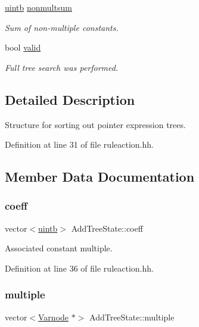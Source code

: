 \begin{DoxyCompactItemize}
\mbox{\hyperlink{types_8h_a2db313c5d32a12b01d26ac9b3bca178f}{uintb}} \mbox{\hyperlink{class_add_tree_state_a0673da5a1c73b83c06a96730b3676778}{nonmultsum}}
\begin{DoxyCompactList}\small\item\em Sum of non-\/multiple constants. \end{DoxyCompactList}\item 
bool \mbox{\hyperlink{class_add_tree_state_aac866a2b0c8bd9cb9e30840195a70293}{valid}}
\begin{DoxyCompactList}\small\item\em Full tree search was performed. \end{DoxyCompactList}\end{DoxyCompactItemize}


\subsection{Detailed Description}
Structure for sorting out pointer expression trees. 

Definition at line 31 of file ruleaction.\+hh.



\subsection{Member Data Documentation}
\mbox{\label{class_add_tree_state_aeb468ac572e503ef8ec084e9f0c1b766}} 
\subsubsection{\texorpdfstring{coeff}{coeff}}
{\footnotesize\ttfamily vector$<$\mbox{\hyperlink{types_8h_a2db313c5d32a12b01d26ac9b3bca178f}{uintb}}$>$ Add\+Tree\+State\+::coeff}



Associated constant multiple. 



Definition at line 36 of file ruleaction.\+hh.

\mbox{\label{class_add_tree_state_a33cf1a3308a896062f44f575c79bb161}} 
\subsubsection{\texorpdfstring{multiple}{multiple}}
{\footnotesize\ttfamily vector$<$\mbox{\hyperlink{class_varnode}{Varnode}} $\ast$$>$ Add\+Tree\+State\+::multiple}



